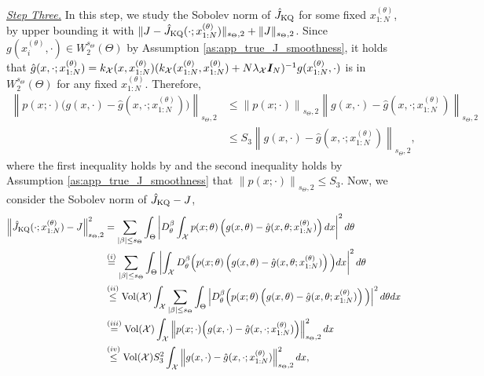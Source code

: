 \underline{\emph{Step Three.}}
In this step, we study the Sobolev norm of $\hat{J}_{\text{KQ}}$ for some fixed $x_{1:N}^{(\theta)}$, by upper bounding it with $\| J - \hat{J}_{\text{KQ}}(\cdot ; x_{1:N}^{(\theta)}) \|_{s_\Theta, 2} + \| J \|_{s_\Theta, 2}$. 
Since $g(x_i^{(\theta)}, \cdot) \in W_2^{s_\Theta}(\Theta) $ by Assumption \ref{as:app_true_J_smoothness}, it holds that $\hat{g}(x, \cdot; x_{1:N}^{(\theta)}) = k_{\mathcal{X}}(x, x_{1:N}^{(\theta)}) (k_{\mathcal{X}}(x_{1:N}^{(\theta)}, x_{1:N}^{(\theta)}) + N \lambda_{\mathcal{X}} \boldsymbol{I}_N)^{-1} g(x_{1:N}^{(\theta)}, \cdot)$ is in $W_2^{s_\Theta}(\Theta)$ for any fixed $x_{1:N}^{(\theta)}$. Therefore,
\begin{align}\label{eq:p_g_hat_g}
    \left\| p(x; \cdot) \Big( g(x, \cdot) - \hat{g}(x, \cdot; x_{1:N}^{(\theta)}) \Big) \right\|_{s_\Theta, 2} 
    &\leq  \left\| p(x; \cdot) \right\|_{s_\Theta, 2} \left\| g(x, \cdot) - \hat{g}(x, \cdot; x_{1:N}^{(\theta)}) \right\|_{s_\Theta, 2} \nonumber \\
    &\leq  S_3 \left\| g(x, \cdot) - \hat{g}(x, \cdot; x_{1:N}^{(\theta)}) \right\|_{s_\Theta, 2},
\end{align}
where the first inequality holds by  and the second inequality holds by Assumption \ref{as:app_true_J_smoothness} that $\left\| p(x; \cdot) \right\|_{s_\Theta, 2} \leq S_3$. Now, we consider the Sobolev norm of $\hat{J}_{\text{KQ}} - J$, 
\begin{align}\label{eq:hat_J_J}
    \left\| \hat{J}_{\text{KQ}}(\cdot ; x_{1:N}^{(\theta)}) - J \right\|_{s_\Theta, 2}^2 
    &= \sum_{ | \beta| \leq s_\Theta } \int_\Theta \left| D_\theta^\beta \int_{\mathcal{X}} p(x; \theta) \left( g(x, \theta) - \hat{g}(x, \theta ; x_{1:N}^{(\theta)}) \right) dx \right|^2 d\theta \nonumber \\
    &\stackrel{(i)}{=} \sum_{ | \beta| \leq s_\Theta } \int_\Theta \left| \int_{\mathcal{X}} D_\theta^\beta \Big( p(x; \theta) \left( g(x, \theta) - \hat{g}(x, \theta; x_{1:N}^{(\theta)}) \right) \Big) dx \right|^2 d \theta \nonumber \\
    &\stackrel{(ii)}{\leq} \text{Vol}(\mathcal{X}) 
    \int_{\mathcal{X}} \sum_{ | \beta| \leq s_\Theta } \int_\Theta \left| D_\theta^\beta \Big( p(x; \theta) \left( g(x, \theta) - \hat{g}(x, \theta ; x_{1:N}^{(\theta)}) \right) \Big) \right|^2 d \theta dx \nonumber \\
    &\stackrel{(iii)}{=} \text{Vol}(\mathcal{X}) 
    \int_{\mathcal{X}} \left\| p(x; \cdot) \Big( g(x, \cdot) - \hat{g}(x, \cdot ; x_{1:N}^{(\theta)}) \Big) \right\|_{s_\Theta, 2}^2 dx \nonumber \\
    &\stackrel{(iv)}{\leq} \text{Vol}(\mathcal{X})  S_3^2 \int_{\mathcal{X}} \left\| g(x, \cdot) - \hat{g}(x, \cdot ; x_{1:N}^{(\theta)}) \right\|_{s_\Theta, 2}^2 dx,
\end{align}

